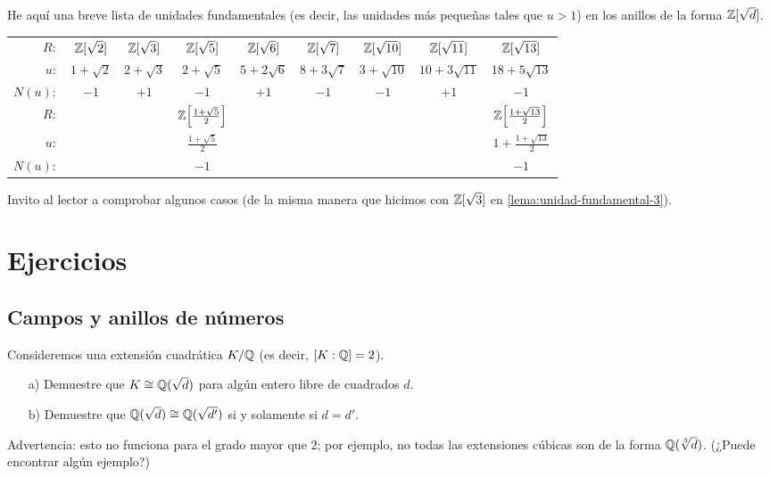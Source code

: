 \begin{ejemplo}
  He aquí una breve lista de unidades fundamentales (es decir, las unidades más
  pequeñas tales que $u > 1$) en los anillos de la forma $\mathbb{Z} [\sqrt{d}]$.

  \renewcommand{\arraystretch}{1.5}
  \begin{center}
    \begin{tabular}{rcccccccc}
      \hline
      $R\colon $ & $\mathbb{Z} [\sqrt{2}]$ & $\mathbb{Z} [\sqrt{3}]$ & $\mathbb{Z} [\sqrt{5}]$ & $\mathbb{Z} [\sqrt{6}]$ & $\mathbb{Z} [\sqrt{7}]$ & $\mathbb{Z} [\sqrt{10}]$ & $\mathbb{Z} [\sqrt{11}]$ & $\mathbb{Z} [\sqrt{13}]$ \\
      $u\colon$ & $1 + \sqrt{2}$ & $2 + \sqrt{3}$ & $2 + \sqrt{5}$ & $5 + 2\sqrt{6}$ & $8 + 3\sqrt{7}$ & $3 + \sqrt{10}$ & $10 + 3\sqrt{11}$ & $18 + 5\sqrt{13}$ \\
      $N (u)\colon$ & $-1$ & $+1$ & $-1$ & $+1$ & $-1$ & $-1$ & $+1$ & $-1$ \\
      \hline
      $R\colon $ & & & $\mathbb{Z} \Bigl[\frac{1+\sqrt{5}}{2}\Bigr]$ & & & & & $\mathbb{Z} \Bigl[\frac{1+\sqrt{13}}{2}\Bigr]$ \\
      $u\colon$ & & & $\frac{1+\sqrt{5}}{2}$ & & & & & $1 + \frac{1+\sqrt{13}}{2}$ \\
      $N (u)\colon$ & & & $-1$ & & & & & $-1$ \\
      \hline
    \end{tabular}
  \end{center}
  \renewcommand{\arraystretch}{1}

  Invito al lector a comprobar algunos casos (de la misma manera que hicimos con
  $\mathbb{Z} [\sqrt{3}]$ en \ref{lema:unidad-fundamental-3}).
\end{ejemplo}

\pagebreak



\section*{Ejercicios}

\subsection*{Campos y anillos de números}

\begin{ejercicio}
  Consideremos una extensión cuadrática $K/\mathbb{Q}$ (es decir, $[K : \mathbb{Q}] = 2$).

  \begin{enumerate}
  \item[a)] Demuestre que $K \cong \mathbb{Q} (\sqrt{d})$ para algún entero libre de
    cuadrados $d$.

  \item[b)] Demuestre que $\mathbb{Q} (\sqrt{d}) \cong \mathbb{Q} (\sqrt{d'})$ si y solamente
    si $d = d'$.
  \end{enumerate}

  Advertencia: esto no funciona para el grado mayor que $2$; por ejemplo,
  no todas las extensiones cúbicas son de la forma $\mathbb{Q} (\sqrt[3]{d})$.
  (¿Puede encontrar algún ejemplo?)
\end{ejercicio}

